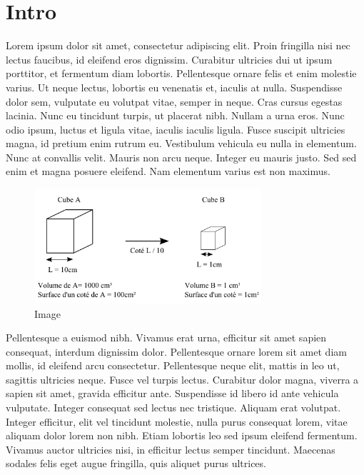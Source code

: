 
\chapter{Intro}

Lorem ipsum dolor sit amet, consectetur adipiscing elit. Proin fringilla
nisi nec lectus faucibus, id eleifend eros dignissim. Curabitur ultricies
dui ut ipsum porttitor, et fermentum diam lobortis. Pellentesque ornare
felis et enim molestie varius. Ut neque lectus, lobortis eu venenatis
et, iaculis at nulla. Suspendisse dolor sem, vulputate eu volutpat
vitae, semper in neque. Cras cursus egestas lacinia. Nunc eu tincidunt
turpis, ut placerat nibh. Nullam a urna eros. Nunc odio ipsum, luctus
et ligula vitae, iaculis iaculis ligula. Fusce suscipit ultricies
magna, id pretium enim rutrum eu. Vestibulum vehicula eu nulla in
elementum. Nunc at convallis velit. Mauris non arcu neque. Integer
eu mauris justo. Sed sed enim et magna posuere eleifend. Nam elementum
varius est non maximus.

\begin{figure}
\begin{centering}
\includegraphics[width=0.75\textwidth]{chapitre1/photo_chap1/cube}
\par\end{centering}
\caption{Image}

\end{figure}

Pellentesque a euismod nibh. Vivamus erat urna, efficitur sit amet
sapien consequat, interdum dignissim dolor. Pellentesque ornare lorem
sit amet diam mollis, id eleifend arcu consectetur. Pellentesque neque
elit, mattis in leo ut, sagittis ultricies neque. Fusce vel turpis
lectus. Curabitur dolor magna, viverra a sapien sit amet, gravida
efficitur ante. Suspendisse id libero id ante vehicula vulputate.
Integer consequat sed lectus nec tristique. Aliquam erat volutpat.
Integer efficitur, elit vel tincidunt molestie, nulla purus consequat
lorem, vitae aliquam dolor lorem non nibh. Etiam lobortis leo sed
ipsum eleifend fermentum. Vivamus auctor ultricies nisi, in efficitur
lectus semper tincidunt. Maecenas sodales felis eget augue fringilla,
quis aliquet purus ultrices.


